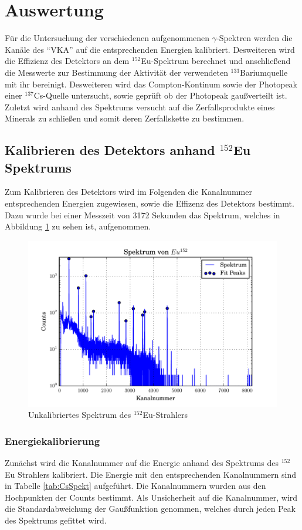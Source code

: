 \section{Auswertung}
\label{sec:Auswertung}
Für die Untersuchung der verschiedenen aufgenommenen $\gamma$-Spektren werden die Kanäle des ``VKA'' auf die entsprechenden Energien kalibriert. Desweiteren wird die Effizienz des Detektors an dem $^{152}$Eu-Spektrum berechnet und anschließend die Messwerte zur Bestimmung der Aktivität der verwendeten $^{133}$Bariumquelle mit ihr bereinigt. Desweiteren wird das Compton-Kontinum sowie der Photopeak einer $^{137}$Cs-Quelle untersucht, sowie geprüft ob der Photopeak gaußverteilt ist. Zuletzt wird anhand des Spektrums versucht auf die Zerfallsprodukte eines Minerals zu schließen und somit deren Zerfallskette zu bestimmen.


\subsection{Kalibrieren des Detektors anhand $^{152}$Eu Spektrums}
Zum Kalibrieren des Detektors wird im Folgenden die Kanalnummer entsprechenden Energien zugewiesen, sowie die Effizenz des Detektors bestimmt. Dazu wurde bei einer Messzeit von 3172 Sekunden das Spektrum, welches in Abbildung \ref{fig:spekEu} zu sehen ist, aufgenommen.
\begin{figure}[H]
  \centering
  \includegraphics[width=\textwidth]{./Bilder/SpektEu.pdf}
  \caption{Unkalibriertes Spektrum des $^{152}$Eu-Strahlers}
  \label{fig:spekEu}
\end{figure}

\subsubsection{Energiekalibrierung}
\label{sec:Kalb}
Zunächst wird die Kanalnummer auf die Energie anhand des Spektrums des $^{152}$Eu Strahlers kalibriert. Die Energie mit den entsprechenden Kanalnummern sind in Tabelle \ref{tab:CsSpekt} aufgeführt. Die Kanalnummern wurden aus den Hochpunkten der Counts bestimmt. Als Unsicherheit auf die Kanalnummer, wird die Standardabweichung der Gaußfunktion genommen, welches durch jeden Peak des Spektrums gefittet wird.

